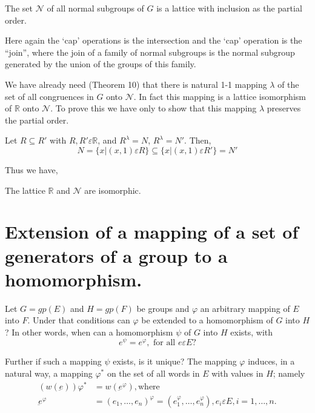 \begin{Theorem} %
  The set $\mathscr{N}$ of all normal subgroups of $G$ is a lattice
  with inclusion as the partial order. 
\end{Theorem}

Here again the `cap' operations is the intersection and the `cap'
operation is the ``join'', where the join of a family of normal
subgroups is the normal subgroup generated by the union of the groups
of this family. 

We have already need (Theorem 10) that there is natural 1-1 mapping
$\lambda$ of the set of all congruences in $G$ onto $\mathscr{N}$. In
fact this mapping is a lattice isomorphism of $\mathbb{R}$ onto
$\mathscr{N}$. To prove this we have only to show that this mapping
$\lambda$ preserves the partial order. 
 
 Let $R \subseteq R'$ with $R, R' \varepsilon \mathbb{R}$, and
 $R^\lambda =N$, $R^\lambda = N'$. Then,  
 $$
 N= \bigg\{ x \big | (x,1) \varepsilon R \bigg\} \subseteq \bigg\{ x
 \big| (x,1) \varepsilon R'\bigg\} = N' 
 $$
 
Thus we have,
\begin{Theorem} %
  The lattice $\mathbb{R}$ and $\mathscr{N}$ are isomorphic.
\end{Theorem} 
 
 \section{Extension of a mapping of a set of generators of a group to
   a homomorphism.} %
 
 Let $G=gp(E)$ and $H = gp (F)$ be groups and $\varphi$ an arbitrary
 mapping of $E$ into $F$. Under that conditions can $\varphi$ be
 extended to a homomorphism of $G$ into $H$? In other words, when can
 a homomorphism $\psi$ of $G$ into $H$ exists, with   
 $$
 e^\psi = e^\varphi,  \text{ for all } e \varepsilon E ?
 $$
 
 Further if such a mapping $\psi$ exists, is it unique? The mapping
 $\varphi$ induces, in a natural way, a mapping $\varphi^*$ on the set
 of all words in $E$ with values in $H$; namely 
\begin{align*}
   (w (\underbar{e})) \varphi^* &= w (\underbar{e}^\varphi), \text{
     where }\\ 
   \underbar{e}^\varphi &= (e_1, \ldots, e_n)^\varphi = (e_1^\varphi, 
   \ldots, e_n^\varphi), e_i \varepsilon E, i= 1, \ldots,  n. 
\end{align*} 

